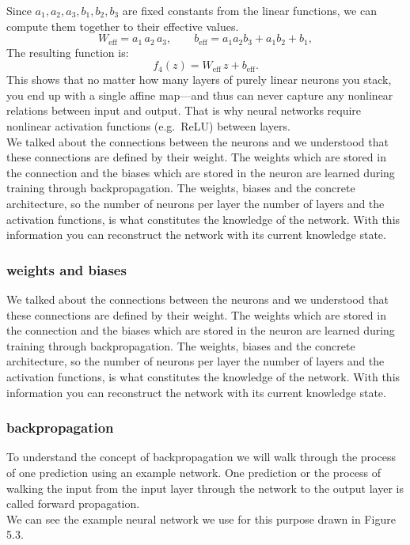 \documentclass[a4paper,12pt]{report}
\begin{document}
Since \(a_1,a_2,a_3,b_1,b_2,b_3\) are fixed constants from the linear functions, we can compute them together to their effective values.
\[
  W_{\mathrm{eff}} = a_1\,a_2\,a_3,
  \qquad
  b_{\mathrm{eff}} = a_1a_2b_3 + a_1b_2 + b_1,
\]
The resulting function is:
\[
  f_4(z) = W_{\mathrm{eff}}\,z + b_{\mathrm{eff}}.
\]
This shows that no matter how many layers of purely linear neurons you stack, you end up with a single affine map—and thus can never capture any nonlinear relations between input and output.  That is why neural networks require nonlinear activation functions (e.g.\ ReLU) between layers. \\

We talked about the connections between the neurons and we understood that these connections are defined by their weight. The weights which are stored in the connection and the biases which are stored in the neuron are learned during training through backpropagation. The weights, biases and the concrete architecture, so the number of neurons per layer the number of layers and the activation functions, is what constitutes the knowledge of the network. With this information you can reconstruct the network with its current knowledge state. 
	\subsubsection{weights and biases}
	We talked about the connections between the neurons and we understood that these connections are defined by their weight. The weights which are stored in the connection and the biases which are stored in the neuron are learned during training through backpropagation. The weights, biases and the concrete architecture, so the number of neurons per layer the number of layers and the activation functions, is what constitutes the knowledge of the network. With this information you can reconstruct the network with its current knowledge state. 
	\subsubsection{backpropagation}
	To understand the concept of backpropagation we will walk through the process of one prediction using an example network. One prediction or the process of walking the input from the input layer through the network to the output layer is called forward propagation. \\
	We can see the example neural network we use for this purpose drawn in Figure 5.3.
	
\end{document}
